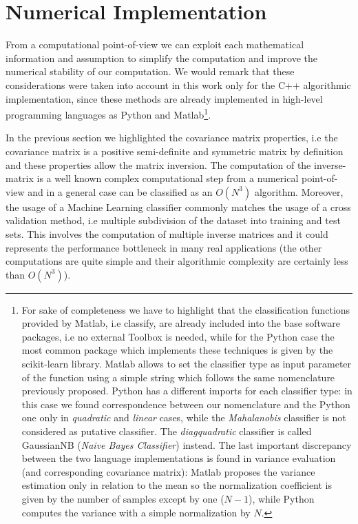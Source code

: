 \documentclass{standalone}
\begin{document}
\section*{Numerical Implementation}

From a computational point-of-view we can exploit each mathematical information and assumption to simplify the computation and improve the numerical stability of our computation.
We would remark that these considerations were taken into account in this work only for the \textsf{C++} algorithmic implementation, since these methods are already implemented in high-level programming languages as \textsf{Python} and \textsf{Matlab}\footnote{
  For sake of completeness we have to highlight that the classification functions provided by \textsf{Matlab}, i.e \textsf{classify}, are already included into the base software packages, i.e no external Toolbox is needed, while for the \textsf{Python} case the most common package which implements these techniques is given by the \textsf{scikit-learn} library.
  \textsf{Matlab} allows to set the classifier type as input parameter of the function using a simple string which follows the same nomenclature previously proposed.
  \textsf{Python} has a different imports for each classifier type: in this case we found correspondence between our nomenclature and the \textsf{Python} one only in \emph{quadratic} and \emph{linear} cases, while the \emph{Mahalanobis} classifier is not considered as putative classifier.
  The \emph{diagquadratic} classifier is called \textsf{GaussianNB} (\emph{Naive Bayes Classifier}) instead.
  The last important discrepancy between the two language implementations is found in variance evaluation (and corresponding covariance matrix): \textsf{Matlab} proposes the variance estimation only in relation to the mean so the normalization coefficient is given by the number of samples except by one ($N-1$), while \textsf{Python} computes the variance with a simple normalization by $N$.
}.

In the previous section we highlighted the covariance matrix properties, i.e the covariance matrix is a positive semi-definite and symmetric matrix by definition and these properties allow the matrix inversion.
The computation of the inverse-matrix is a well known complex computational step from a numerical point-of-view and in a general case can be classified as an $O(N^3)$ algorithm.
Moreover, the usage of a Machine Learning classifier commonly matches the usage of a cross validation method, i.e multiple subdivision of the dataset into training and test sets.
This involves the computation of multiple inverse matrices and it could represents the performance bottleneck in many real applications (the other computations are quite simple and their algorithmic complexity are certainly less than $O(N^3)$).
\end{document}

